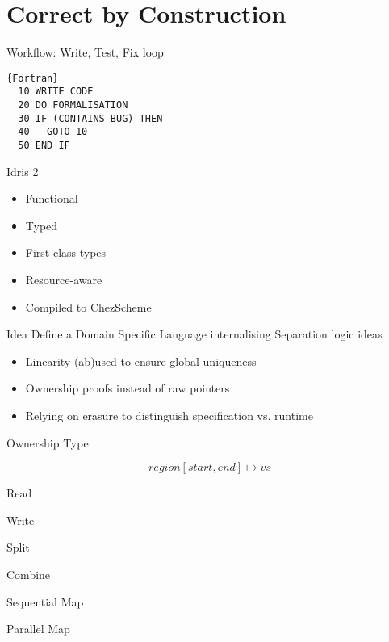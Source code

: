 \section{Correct by Construction}

\begin{frame}[fragile]{Workflow: Write, Test, Fix loop}

\begin{lstlisting}{Fortran}
  10 WRITE CODE
  20 DO FORMALISATION
  30 IF (CONTAINS BUG) THEN
  40   GOTO 10
  50 END IF
\end{lstlisting}

\end{frame}

\begin{frame}{Idris 2}
  \begin{itemize}
    \item Functional
    \item Typed
    \item First class types
    \item Resource-aware
    \item Compiled to ChezScheme
  \end{itemize}
\end{frame}


\begin{frame}{Idea}
  Define a Domain Specific Language internalising
  Separation logic ideas

  \begin{itemize}
    \item Linearity (ab)used to ensure global uniqueness
    \item Ownership proofs instead of raw pointers
    \item Relying on erasure to distinguish specification vs. runtime
  \end{itemize}

\end{frame}

\begin{frame}{Ownership Type}


  $$\mathit{region}[\mathit{start}, \mathit{end}] \mapsto \mathit{vs}$$


\end{frame}


\begin{frame}{Read}
\end{frame}

\begin{frame}{Write}
\end{frame}

\begin{frame}{Split}
\end{frame}

\begin{frame}{Combine}
\end{frame}


\begin{frame}{Sequential Map}
\end{frame}


\begin{frame}{Parallel Map}
\end{frame}
